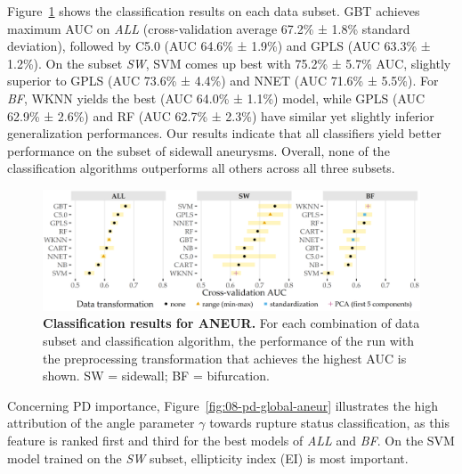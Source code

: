 \documentclass[
  oneside]{book}
\begin{document}
Figure~\ref{fig:08-results-cbms} shows the classification results on each data subset.
GBT achieves maximum AUC on \emph{ALL} (cross-validation average 67.2\% ± 1.8\% standard deviation), followed by C5.0 (AUC 64.6\% ± 1.9\%) and GPLS (AUC 63.3\% ± 1.2\%).
On the subset \emph{SW}, SVM comes up best with 75.2\% ± 5.7\% AUC, slightly superior to GPLS (AUC 73.6\% ± 4.4\%) and NNET (AUC 71.6\% ± 5.5\%).
For \emph{BF}, WKNN yields the best (AUC 64.0\% ± 1.1\%) model, while GPLS (AUC 62.9\% ± 2.6\%) and RF (AUC 62.7\% ± 2.3\%) have similar yet slightly inferior generalization performances.
Our results indicate that all classifiers yield better performance on the subset of sidewall aneurysms.
Overall, none of the classification algorithms outperforms all others across all three subsets.



\begin{figure}[htb]

{\centering \includegraphics[width=1\linewidth]{figures/08-results-cbms} 

}

\caption{\textbf{Classification results for ANEUR.} For each combination of data subset and classification algorithm, the performance of the run with the preprocessing transformation that achieves the highest AUC is shown. SW = sidewall; BF = bifurcation.}\label{fig:08-results-cbms}
\end{figure}

Concerning PD importance, Figure~\ref{fig:08-pd-global-aneur} illustrates the high attribution of the angle parameter \(\gamma\) towards rupture status classification, as this feature is ranked first and third for the best models of \emph{ALL} and \emph{BF}.
On the SVM model trained on the \emph{SW} subset, ellipticity index (EI) is most important.
\end{document}
